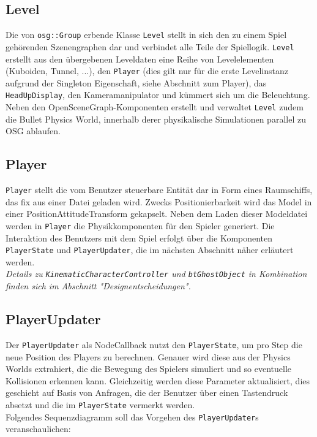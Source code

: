 \documentclass{llncs}
\begin{document}
\subsection{Level}
Die von \texttt{osg::Group} erbende Klasse \texttt{Level} stellt in sich den zu einem Spiel geh\"orenden Szenengraphen
dar und verbindet alle Teile der Spiellogik. \texttt{Level} erstellt aus den \"ubergebenen Leveldaten eine Reihe
von Levelelementen (Kuboiden, Tunnel, ...), den \texttt{Player} (dies gilt nur f\"ur die erste Levelinstanz aufgrund der Singleton Eigenschaft, siehe Abschnitt zum Player),
das \texttt{HeadUpDisplay}, den Kameramanipulator und k\"ummert sich um die Beleuchtung.\\
Neben den OpenSceneGraph-Komponenten erstellt und verwaltet \texttt{Level} zudem die Bullet Physics World, innerhalb
derer physikalische Simulationen parallel zu OSG ablaufen.\\


\subsection{Player}
\texttt{Player} stellt die vom Benutzer steuerbare Entit\"at dar in Form eines Raumschiffs, das fix aus einer Datei
geladen wird. Zwecks Positionierbarkeit wird das Model in einer PositionAttitudeTransform gekapselt.
Neben dem Laden dieser Modeldatei werden in \texttt{Player} die Physikkomponenten f\"ur den Spieler generiert.
Die Interaktion des Benutzers mit dem Spiel erfolgt \"uber die Komponenten \texttt{PlayerState} und \texttt{PlayerUpdater},
die im n\"achsten Abschnitt n\"aher erl\"autert werden.\\
\textit{Details zu \texttt{KinematicCharacterController} und \texttt{btGhostObject} in Kombination finden sich im Abschnitt "Designentscheidungen".}

\subsection{PlayerUpdater}
Der \texttt{PlayerUpdater} als NodeCallback nutzt den \texttt{PlayerState}, um pro Step die neue Position des Players
zu berechnen. Genauer wird diese aus der Physics Worlds extrahiert, die die Bewegung des Spielers simuliert und so
eventuelle Kollisionen erkennen kann. Gleichzeitig werden diese Parameter aktualisiert, dies geschieht auf Basis von
Anfragen, die der Benutzer \"uber einen Tastendruck absetzt und die im \texttt{PlayerState} vermerkt werden.\\
Folgendes Sequenzdiagramm soll das Vorgehen des \texttt{PlayerUpdater}s veranschaulichen:
\end{document}
